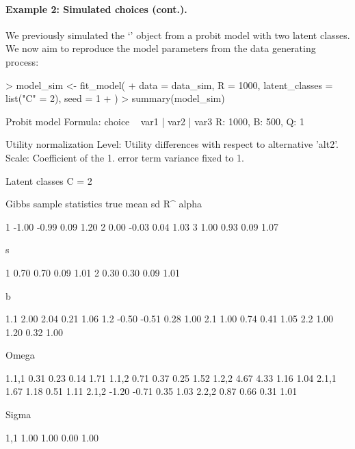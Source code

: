 \documentclass[article]{jss}
\newcommand{\class}[1]{`\code{#1}'}
\begin{document}
\paragraph{Example 2: Simulated choices (cont.).}

We previously simulated the \class{RprobitB\_data} object  from a probit model with two latent classes. We now aim to reproduce the model parameters from the data generating process:

\begin{Schunk}
\begin{Sinput}
> model_sim <- fit_model(
+    data = data_sim, R = 1000, latent_classes = list("C" = 2), seed = 1
+  )
> summary(model_sim)
\end{Sinput}
\begin{Soutput}
Probit model
Formula: choice ~ var1 | var2 | var3 
R: 1000, B: 500, Q: 1

Utility normalization
Level: Utility differences with respect to alternative 'alt2'.
Scale: Coefficient of the 1. error term variance fixed to 1.

Latent classes
C = 2 

Gibbs sample statistics
          true    mean      sd      R^
 alpha
                                      
     1   -1.00   -0.99    0.09    1.20
     2    0.00   -0.03    0.04    1.03
     3    1.00    0.93    0.09    1.07

 s
                                      
     1    0.70    0.70    0.09    1.01
     2    0.30    0.30    0.09    1.01

 b
                                      
   1.1    2.00    2.04    0.21    1.06
   1.2   -0.50   -0.51    0.28    1.00
   2.1    1.00    0.74    0.41    1.05
   2.2    1.00    1.20    0.32    1.00

 Omega
                                      
 1.1,1    0.31    0.23    0.14    1.71
 1.1,2    0.71    0.37    0.25    1.52
 1.2,2    4.67    4.33    1.16    1.04
 2.1,1    1.67    1.18    0.51    1.11
 2.1,2   -1.20   -0.71    0.35    1.03
 2.2,2    0.87    0.66    0.31    1.01

 Sigma
                                      
   1,1    1.00    1.00    0.00    1.00
\end{Soutput}
\end{Schunk}
\end{document}
